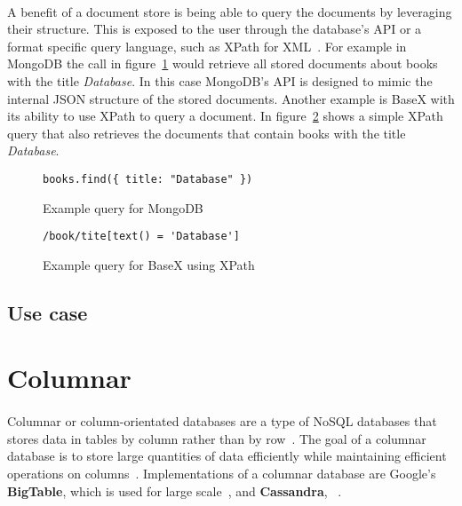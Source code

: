 \documentclass{CRPITStyle}
\renewcommand{\cite}{\citep}
\begin{document}
\paragraph{}
A benefit of a document store is being able to query the documents
by leveraging their structure.
This is exposed to the user through the database's API or a format specific
query language, such as XPath for XML~\cite{xpath}.
For example in MongoDB the call in figure~\ref{lst:mongo} would retrieve all
stored documents about books with the title \textit{Database}.
In this case MongoDB's API is designed to mimic the internal JSON structure 
of the stored documents.
Another example is BaseX with its ability to use XPath to query a document.
In figure~\ref{lst:basex} shows a simple XPath query that also retrieves
the documents that contain books with the title \textit{Database}.

\begin{figure}
\begin{verbatim}
books.find({ title: "Database" })
\end{verbatim}
\caption{Example query for MongoDB}
\label{lst:mongo}
\end{figure}

\begin{figure}
\begin{verbatim}
/book/tite[text() = 'Database']
\end{verbatim}
\caption{Example query for BaseX using XPath}
\label{lst:basex}
\end{figure}

\subsection{Use case}

\cite{nosql_performance}


\section{Columnar}

\paragraph{}
Columnar or column-orientated databases are a type of NoSQL databases that
stores data in tables by column rather than by row~\cite{nosql_survey}.
The goal of a columnar database is to store large quantities of data efficiently
while maintaining efficient operations on columns~\cite{nosql_survey,nosql_eval}.
Implementations of a columnar database are Google's
\textbf{BigTable}, which is used for large scale~\cite{bigtable}, and
\textbf{Cassandra}, ~\cite{cassandra}.
\end{document}
